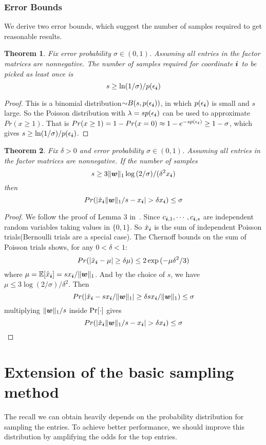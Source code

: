 \documentclass[letterpaper]{article}
\newcommand{\V}[1]{{\boldsymbol{{\MakeLowercase{#1}}}}}
\newcommand{\predx}{\hat{x}_{\V{i}}}
\newcommand{\norm}[2]{\|#1\|_{#2}}
\newtheorem{theorem}{Theorem}
\begin{document}
\subsubsection{Error Bounds}
We derive two error bounds, which suggest the number of samples required to get reasonable results. 
\begin{theorem}\label{theo:ObservationBound}
Fix error probability $\sigma \in (0,1)$.
Assuming all entries in the factor matrices are nonnegative.
The number of samples required for coordinate $\V{i}$ to be picked as least once is
\[
    s \geq \ln(1/\sigma)/p(\epsilon_{\V{i}})
\]
\end{theorem}
\begin{proof}
This is a binomial distribution${\sim}B(s,p(\epsilon_{\V{i}}))$,
in which $p(\epsilon_{\V{i}})$ is small and $s$ large.
So the Poisson distribution with $\lambda = sp(\epsilon_{\V{i}})$
can be used to approximate $Pr(x\geq1)$.
That is $Pr(x\geq1) = 1-Pr(x=0)\approx 1-e^{-sp(\epsilon_{\V{i}})} \geq 1-\sigma$,
which gives $s \geq \ln(1/\sigma)/p(\epsilon_{\V{i}})$.
\end{proof}

\begin{theorem}\label{theo:Bound}
Fix $\delta > 0$ and error probability $\sigma \in (0,1)$.
Assuming all entries in the factor matrices are nonnegative.
If the number of samples
\[
    s \geq 3\norm{\V{w}}{1}\log{(2/\sigma)}/(\delta^2 x_{\V{i}})
\]
then
\[
    Pr(|\predx\norm{\V{W}}{1}/s - x_{\V{i}}| > \delta x_{\V{i}}) \leq \sigma
\]
\end{theorem}

\begin{proof}
We follow the proof of Lemma 3 in~\cite{BaPiKoSe15}.
Since  $c_{\V{i},1},\cdots,c_{\V{i},s}$
are independent random variables taking values in $\{0,1\}$.
So $\predx$ is the sum of independent Poisson trials(Bernoulli trials are a special case).
The Chernoff bounds on the sum of Poisson trials shows, for any $0 <\delta <1 $:
\[
    Pr(|\predx - \mu|\geq\delta\mu) \leq 2\exp{(-\mu\delta^2/3)}
\]
where $\mu=\mathbb{E}[\predx]=sx_{\V{i}}/\norm{\V{W}}{1}$.
And by the choice of $s$, we have
$\mu\leq 3\log{(2/\sigma)/\delta^2}$.
Then
\[
    Pr(|\predx-sx_{\V{i}}/\norm{\V{W}}{1}|\geq\delta sx_{\V{i}}/\norm{\V{W}}{1}) \leq \sigma
\]
multiplying $\norm{\V{W}}{1}/s$ inside ${\rm Pr}[\cdot]$ gives
\[
    Pr(|\predx\norm{\V{W}}{1}/s - x_{\V{i}}| > \delta x_{\V{i}}) \leq \sigma
\]
\end{proof}


\section{Extension of the basic sampling method}
The recall we can obtain heavily depends on 
the probability distribution for sampling the entries. 
To achieve better performance, 
we should improve this distribution by amplifying the odds for the top entries.
\end{document}
